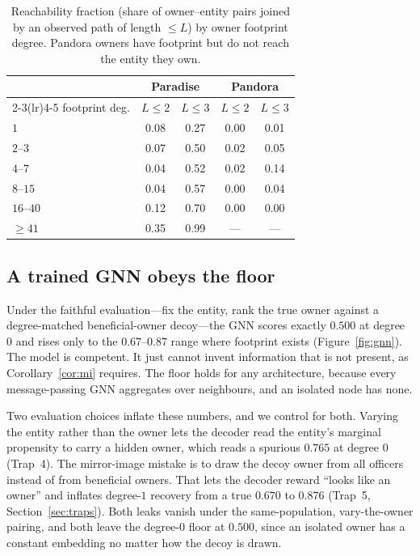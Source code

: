 \documentclass[sigconf]{acmart}
\begin{document}
\begin{table}[t]
\caption{Reachability fraction (share of owner--entity pairs joined by an observed
path of length $\le L$) by owner footprint degree. Pandora owners have footprint
but do not reach the entity they own.}
\label{tab:reach}
\small
\begin{tabular}{@{}lcccc@{}}
\toprule
& \multicolumn{2}{c}{\textbf{Paradise}} & \multicolumn{2}{c}{\textbf{Pandora}}\\
\cmidrule(lr){2-3}\cmidrule(lr){4-5}
footprint deg. & $L\!\le\!2$ & $L\!\le\!3$ & $L\!\le\!2$ & $L\!\le\!3$\\
\midrule
$1$       & 0.08 & 0.27 & 0.00 & 0.01\\
$2$--$3$  & 0.07 & 0.50 & 0.02 & 0.05\\
$4$--$7$  & 0.04 & 0.52 & 0.02 & 0.14\\
$8$--$15$ & 0.04 & 0.57 & 0.00 & 0.04\\
$16$--$40$& 0.12 & 0.70 & 0.00 & 0.00\\
$\ge41$   & 0.35 & 0.99 & --- & ---\\
\bottomrule
\end{tabular}
\end{table}

\subsection{A trained GNN obeys the floor}\label{sec:gnn}
Under the faithful evaluation---fix the entity, rank the true owner against a
degree-matched beneficial-owner decoy---the GNN scores exactly $0.500$ at degree
$0$ and rises only to the $0.67$--$0.87$ range where footprint exists
(Figure~\ref{fig:gnn}). The model is competent. It just cannot invent information
that is not present, as Corollary~\ref{cor:mi} requires. The floor holds for any
architecture, because every message-passing GNN aggregates over neighbours, and an
isolated node has none.

Two evaluation choices inflate these numbers, and we control for both. Varying the
entity rather than the owner lets the decoder read the entity's marginal
propensity to carry a hidden owner, which reads a spurious $0.765$ at degree $0$
(Trap~4). The mirror-image mistake is to draw the decoy owner from all officers
instead of from beneficial owners. That lets the decoder reward ``looks like an
owner'' and inflates degree-$1$ recovery from a true $0.670$ to $0.876$ (Trap~5,
Section~\ref{sec:traps}). Both leaks vanish under the same-population,
vary-the-owner pairing, and both leave the degree-$0$ floor at $0.500$, since an
isolated owner has a constant embedding no matter how the decoy is drawn.
\end{document}

